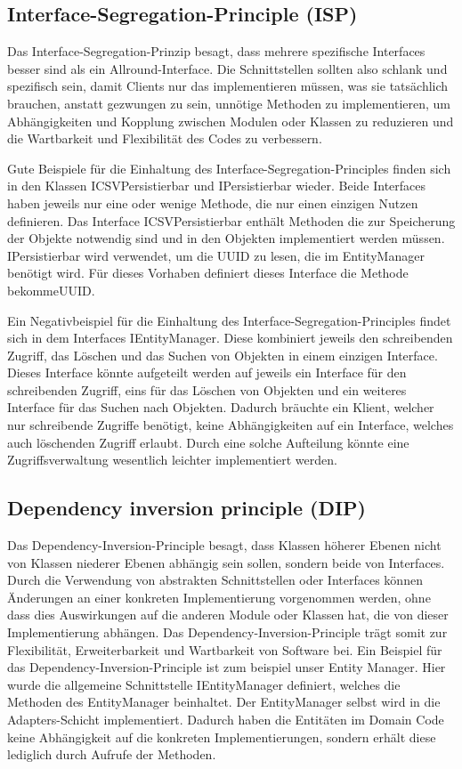 \subsection{Interface-Segregation-Principle (ISP)}
Das Interface-Segregation-Prinzip besagt, dass mehrere spezifische Interfaces besser sind als ein Allround-Interface.
Die Schnittstellen sollten also schlank und spezifisch sein, damit Clients nur das implementieren müssen, was sie tatsächlich brauchen, anstatt gezwungen zu sein, unnötige Methoden zu implementieren, um Abhängigkeiten und Kopplung zwischen Modulen oder Klassen zu reduzieren und die Wartbarkeit und Flexibilität des Codes zu verbessern.

Gute Beispiele für die Einhaltung des Interface-Segregation-Principles finden sich in den Klassen ICSVPersistierbar und IPersistierbar wieder.
Beide Interfaces haben jeweils nur eine oder wenige Methode, die nur einen einzigen Nutzen definieren. Das Interface ICSVPersistierbar enthält Methoden die zur Speicherung der Objekte notwendig sind und in den Objekten implementiert werden müssen. IPersistierbar wird verwendet, um die UUID zu lesen, die im EntityManager benötigt wird.  Für dieses Vorhaben definiert dieses Interface die Methode bekommeUUID.

Ein Negativbeispiel für die Einhaltung des Interface-Segregation-Principles findet sich in dem Interfaces IEntityManager. Diese kombiniert jeweils den schreibenden Zugriff, das Löschen und das Suchen von Objekten in einem einzigen Interface. Dieses Interface könnte aufgeteilt werden auf jeweils ein Interface für den schreibenden Zugriff, eins für das Löschen von Objekten und ein weiteres Interface für das Suchen nach Objekten. Dadurch bräuchte ein Klient, welcher nur schreibende Zugriffe benötigt, keine Abhängigkeiten auf ein Interface, welches auch löschenden Zugriff erlaubt. Durch eine solche Aufteilung könnte eine Zugriffsverwaltung wesentlich leichter implementiert werden.
\subsection{Dependency inversion principle (DIP)}
Das Dependency-Inversion-Principle besagt, dass Klassen höherer Ebenen nicht von Klassen niederer Ebenen abhängig sein sollen, sondern beide
von Interfaces. Durch die Verwendung von abstrakten Schnittstellen oder Interfaces können Änderungen an einer konkreten Implementierung vorgenommen werden, ohne dass dies Auswirkungen auf die anderen Module oder Klassen hat, die von dieser Implementierung abhängen. Das Dependency-Inversion-Principle trägt somit zur Flexibilität, Erweiterbarkeit und Wartbarkeit von Software bei.
Ein Beispiel für das Dependency-Inversion-Principle ist zum beispiel unser Entity Manager. Hier wurde die allgemeine Schnittstelle IEntityManager definiert, welches die Methoden des EntityManager beinhaltet. Der EntityManager selbst wird in die Adapters-Schicht implementiert. Dadurch
haben die Entitäten im Domain Code keine Abhängigkeit auf die
konkreten Implementierungen, sondern erhält diese lediglich durch Aufrufe der Methoden.

